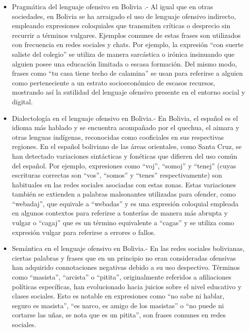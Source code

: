 \begin{itemize}
	\item Pragmática del lenguaje ofensivo en Bolivia .- Al igual que en otras sociedades, en Bolivia se ha arraigado el uso de lenguaje ofensivo indirecto, empleando expresiones coloquiales que transmiten críticas o desprecio sin recurrir a términos vulgares. Ejemplos comunes de estas frases son utilizados con frecuencia en redes sociales y chats. Por ejemplo, la expresión ``con suerte saliste del colegio'' se utiliza de manera sarcástica o irónica insinuando que alguien posee una educación limitada o escasa formación. Del mismo modo, frases como ``tu casa tiene techo de calamina'' se usan para referirse a alguien como perteneciente a un estrato socioeconómico de escasos recursos, mostrando así la sutilidad del lenguaje ofensivo presente en el entorno social y digital.
	
	\item Dialectología en el lenguaje ofensivo en Bolivia.- En Bolivia, el español es el idioma más hablado y se encuentra acompañado por el quechua, el aimara y otras lenguas indígenas, reconocidas como cooficiales en sus respectivas regiones. En el español boliviano de las áreas orientales, como Santa Cruz, se han detectado variaciones sintácticas y fonéticas que difieren del uso común del español. Por ejemplo, expresiones como ``voj'', ``somoj'' y ``tenej'' (cuyas escrituras correctas son ``vos'', ``somos'' y ``tenes'' respectivamente) son habituales en las redes sociales asociadas con estas zonas. Estas variaciones también se extienden a palabras malsonantes utilizadas para ofender, como ``webadaj'', que equivale a ``webadas'' y es una expresión coloquial empleada en algunos contextos para referirse a tonterías de manera más abrupta y vulgar o ``cagaj'' que es un término equivalente a ``cagas'' y se utiliza como expresión vulgar para referirse a errores o fallos.
	
	\item Semántica en el lenguaje ofensivo en Bolivia.- En las redes sociales bolivianas, ciertas palabras y frases que en un principio no eran consideradas ofensivas han adquirido connotaciones negativas debido a su uso despectivo. Términos como ``masista'', ``arcista'' o ``pitita'', originalmente referidos a afiliaciones políticas específicas, han evolucionado hacia juicios sobre el nivel educativo y clases sociales. Esto es notable en expresiones como ``no sabe ni hablar, seguro es masista'', ``es narco, es amigo de los masistas'' o ``no puede ni cortarse las uñas, se nota que es un pitita'', son frases comunes en redes sociales.


\end{itemize}
